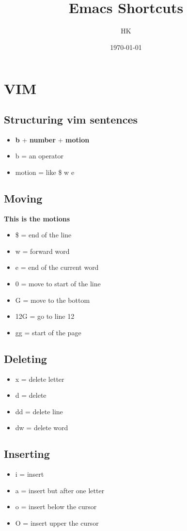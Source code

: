 \documentclass[11pt]{article}
\author{HK}
\date{\today}
\title{Emacs Shortcuts}
\begin{document}
\maketitle
\section*{VIM}
\label{sec:orgd26e581}
\subsection*{Structuring vim sentences}
\label{sec:org3617481}
\begin{itemize}
\item \textbf{b} + \textbf{number} + \textbf{motion}
\item b = an operator
\item motion = like \$ w e
\end{itemize}
\subsection*{Moving}
\label{sec:orgd0977c7}
\textbf{This is the motions}
\begin{itemize}
\item \$ = end of the line
\item w = forward word
\item e = end of the current word
\item 0 = move to start of the line
\item G = move to the bottom
\item 12G = go to line 12
\item gg = start of the page
\end{itemize}
\subsection*{Deleting}
\label{sec:org1d76f95}
\begin{itemize}
\item x = delete letter
\item d = delete
\item dd = delete line
\item dw = delete word
\end{itemize}
\subsection*{Inserting}
\label{sec:org915b0a6}
\begin{itemize}
\item i = insert
\item a = insert but after one letter
\item o = insert below the cursor
\item O = insert upper the cursor
\end{itemize}
\end{document}
